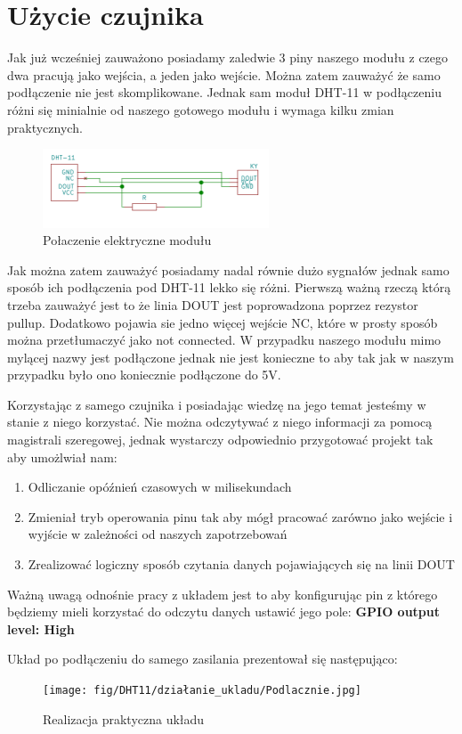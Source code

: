 \documentclass[11pt, a4paper]{article}
\begin{document}
\section{Użycie czujnika}
Jak już wcześniej zauważono posiadamy zaledwie 3 piny naszego modułu z czego dwa pracują jako wejścia, a jeden jako wejście. Można zatem zauważyć że samo podłączenie nie jest skomplikowane. Jednak sam moduł DHT-11 w podłączeniu różni się minialnie od naszego gotowego modułu i wymaga kilku zmian praktycznych.
\begin{figure}[h!]
    \centering
    \includegraphics[width=0.6\textwidth]{fig/DHT11/polaczenie_modulu/schematPodlaczenia.png}
    \caption{Połaczenie elektryczne modułu}
    \label{fig:my_label}
\end{figure}
Jak można zatem zauważyć posiadamy nadal równie dużo sygnałów jednak samo sposób ich podłączenia pod DHT-11 lekko się różni. Pierwszą ważną rzeczą którą trzeba zauważyć jest to że linia DOUT jest poprowadzona poprzez rezystor pullup. Dodatkowo pojawia sie jedno więcej wejście NC, które w prosty sposób można przetłumaczyć jako not connected. W przypadku naszego modułu mimo mylącej nazwy jest podłączone jednak nie jest konieczne to aby tak jak w naszym przypadku było ono koniecznie podłączone do 5V.


Korzystając z samego czujnika i posiadając wiedzę na jego temat jesteśmy w stanie z niego korzystać. Nie można odczytywać z niego informacji za pomocą magistrali szeregowej, jednak wystarczy odpowiednio przygotować projekt tak aby umożlwiał nam:
\begin{enumerate}
    \item Odliczanie opóźnień czasowych w milisekundach
    \item Zmieniał tryb operowania pinu tak aby mógł pracować zarówno jako wejście i wyjście w zależności od naszych zapotrzebowań
    \item Zrealizować logiczny sposób czytania danych pojawiających się na linii DOUT
\end{enumerate}
Ważną uwagą odnośnie pracy z układem jest to aby konfigurując pin z którego będziemy mieli korzystać do odczytu danych ustawić jego pole: \newline
\textbf{GPIO output level: High}


Układ po podłączeniu do samego zasilania prezentował się następująco: 
\begin{figure}[h!]
    \centering
    \texttt{[image: fig/DHT11/działanie\_ukladu/Podlacznie.jpg]}
    \caption{Realizacja praktyczna układu}
    \label{fig:dzialanie}
\end{figure}

\newpage
\printbibliography[heading=bibintoc]
\end{document}
